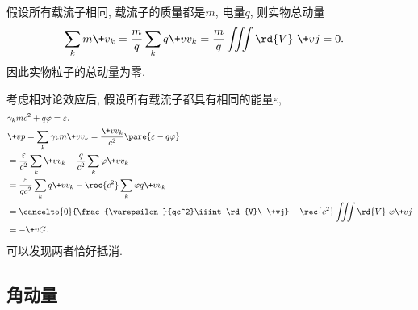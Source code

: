 \documentclass[hidelinks]{ctexart}
\begin{document}
假设所有载流子相同, 载流子的质量都是$m$, 电量$q$, 则实物总动量
\begin{align*}
    \sum_k m\+v_k &= \frac{m}{q}\sum_k q \+vv_k = \frac{m}{q} \iiint \rd{V}\ \+vj = 0.
\end{align*}
因此实物粒子的总动量为零.
\par
考虑相对论效应后, 假设所有载流子都具有相同的能量$\varepsilon$,
\begin{align*}
    & \gamma_k mc^2 + q\varphi = \varepsilon. \\
    & \+vp = \sum_k \gamma_k m \+vv_k = \frac{\+vv_k}{c^2}\pare{\varepsilon - q\varphi} \\
    &= \frac{\varepsilon}{c^2}\sum_k \+vv_k - \frac{q}{c^2}\sum_k \varphi \+vv_k \\
    &= \frac{\varepsilon}{qc^2} \sum_k q\+vv_k - \rec{c^2}\sum_k \varphi q \+vv_k \\
    &= \cancelto{0}{\frac{\varepsilon}{qc^2}\iiint\rd{V}\ \+vj} - \rec{c^2} \iiint\rd{V}\ \varphi\+vj \\
    &= -\+vG.
\end{align*}
可以发现两者恰好抵消.



\subsection{角动量} %
\label{sub:角动量}
\end{document}
